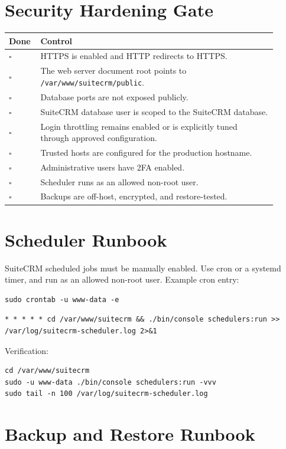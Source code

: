 \documentclass[11pt]{article}
\begin{document}
\section{Security Hardening Gate}
\begin{longtable}{L{0.08\linewidth} L{0.82\linewidth}}
\textbf{Done} & \textbf{Control} \\
\hline
$\square$ & HTTPS is enabled and HTTP redirects to HTTPS. \\
$\square$ & The web server document root points to \texttt{/var/www/suitecrm/public}. \\
$\square$ & Database ports are not exposed publicly. \\
$\square$ & SuiteCRM database user is scoped to the SuiteCRM database. \\
$\square$ & Login throttling remains enabled or is explicitly tuned through approved configuration. \\
$\square$ & Trusted hosts are configured for the production hostname. \\
$\square$ & Administrative users have 2FA enabled. \\
$\square$ & Scheduler runs as an allowed non-root user. \\
$\square$ & Backups are off-host, encrypted, and restore-tested. \\
\end{longtable}

\section{Scheduler Runbook}
SuiteCRM scheduled jobs must be manually enabled. Use cron or a systemd timer, and run as an allowed non-root user. Example cron entry:

\begin{verbatim}
sudo crontab -u www-data -e
\end{verbatim}

\begin{verbatim}
* * * * * cd /var/www/suitecrm && ./bin/console schedulers:run >> /var/log/suitecrm-scheduler.log 2>&1
\end{verbatim}

Verification:
\begin{verbatim}
cd /var/www/suitecrm
sudo -u www-data ./bin/console schedulers:run -vvv
sudo tail -n 100 /var/log/suitecrm-scheduler.log
\end{verbatim}

\section{Backup and Restore Runbook}
\end{document}
